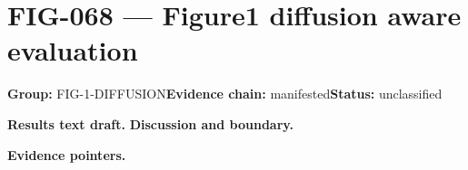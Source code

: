 \clearpage
\section{FIG-068 --- Figure1 diffusion aware evaluation}
\label{figpage:fig-068}
\textbf{Group:} FIG-1-DIFFUSION\quad \textbf{Evidence chain:} manifested\quad \textbf{Status:} unclassified

\textbf{Results text draft.} 
\textbf{Discussion and boundary.} 


\textbf{Evidence pointers.}



\vfill
